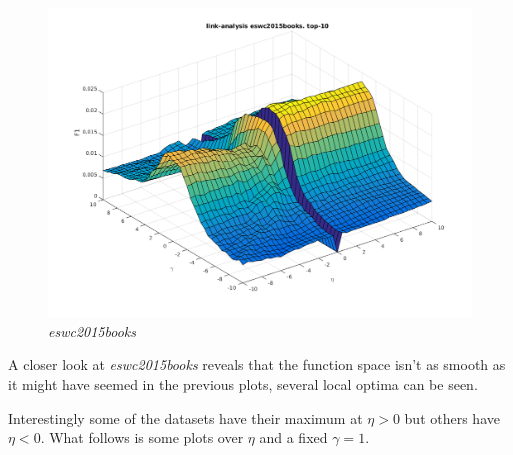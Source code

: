 \FloatBarrier

\begin{figure}[h!]
    \includegraphics[width=\textwidth]{fig/link_eta_gamma/eswc2015books_link.png}
    \caption{\textit{eswc2015books}}
\end{figure}

\FloatBarrier

A closer look at \textit{eswc2015books} reveals that the function space isn't as smooth as it might have seemed in the previous plots, several local optima can be seen.

\newpage

Interestingly some of the datasets have their maximum at $\eta > 0$ but others have $\eta < 0$. What follows is some plots over $\eta$ and a fixed $\gamma = 1$.

\FloatBarrier

